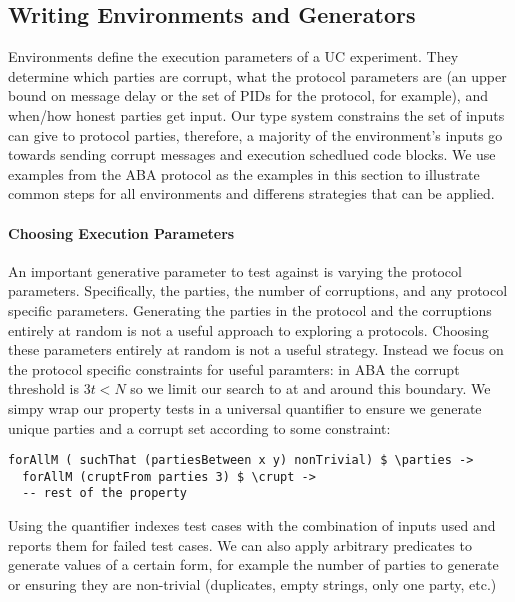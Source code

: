\subsection{Writing Environments and Generators}
Environments define the execution parameters of a UC experiment.
They determine which parties are corrupt, what the protocol parameters are (an upper bound on message delay or the set of PIDs for the protocol, for example), and when/how honest parties get input.
Our type system constrains the set of inputs \Z can give to protocol parties, therefore, a majority of the environment's inputs go towards sending corrupt messages and execution schedlued code blocks.
We use examples from the ABA protocol as the examples in this section to illustrate common steps for all environments and differens strategies that can be applied.

\paragraph{Choosing Execution Parameters}
An important generative parameter to test against is varying the protocol parameters. Specifically, the parties, the number of corruptions, and any protocol specific parameters.
Generating the parties in the protocol and the corruptions entirely at random is not a useful approach to exploring a protocols.
Choosing these parameters entirely at random is not a useful strategy.
Instead we focus on the protocol specific constraints for useful paramters: in ABA the corrupt threshold is $3t < N$ so we limit our search to at and around this boundary.
We simpy wrap our property tests in a universal quantifier to ensure we generate unique parties and a corrupt set according to some constraint:
\begin{lstlisting}
forAllM ( suchThat (partiesBetween x y) nonTrivial) $ \parties -> 
  forAllM (cruptFrom parties 3) $ \crupt ->
  -- rest of the property
\end{lstlisting}
Using the  quantifier indexes test cases with the combination of inputs used and reports them for failed test cases.
We can also apply arbitrary predicates to generate values of a certain form, for example the number of parties to generate or ensuring they are non-trivial (duplicates, empty strings, only one party, etc.)

